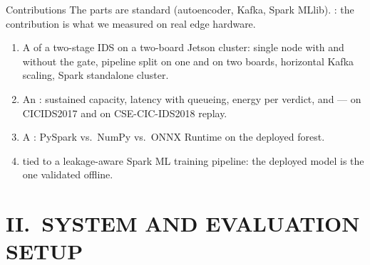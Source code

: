 \documentclass[aspectratio=169, 11pt]{beamer}
\begin{document}
\begin{frame}{Contributions}
  The parts are standard (autoencoder, Kafka, Spark MLlib). : the contribution is what we measured on real edge hardware.
  \vspace{0.3em}
  \begin{enumerate}\small
    \item A  of a two-stage IDS on a two-board Jetson
          cluster: single node with and without the gate, pipeline split on
          one and on two boards, horizontal Kafka scaling, Spark standalone
          cluster.
    \item An : sustained capacity, latency with
          queueing, energy per verdict, and  --- on CICIDS2017 and on CSE-CIC-IDS2018 replay.
    \item A : PySpark vs.\ NumPy vs.\ ONNX
          Runtime on the deployed forest.
    \item {} tied to a leakage-aware Spark ML
          training pipeline: the deployed model is the one validated offline.
  \end{enumerate}
\end{frame}

\section{II.\ SYSTEM AND EVALUATION SETUP}
\end{document}
